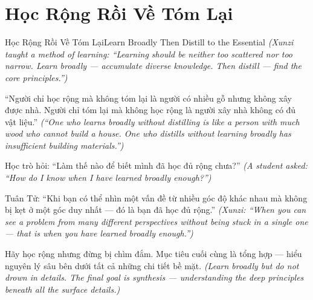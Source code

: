 \section{Học Rộng Rồi Về Tóm Lại}
\begin{truyen}{Học Rộng Rồi Về Tóm Lại}{Learn Broadly Then Distill to the Essential}
\textit{(Xunzi taught a method of learning: ``Learning should be neither too scattered nor too narrow. Learn broadly — accumulate diverse knowledge. Then distill — find the core principles.'')}

``Người chỉ học rộng mà không tóm lại là người có nhiều gỗ nhưng không xây được nhà. Người chỉ tóm lại mà không học rộng là người xây nhà không có đủ vật liệu.''
\textit{(``One who learns broadly without distilling is like a person with much wood who cannot build a house. One who distills without learning broadly has insufficient building materials.'')}

Học trò hỏi: ``Làm thế nào để biết mình đã học đủ rộng chưa?''
\textit{(A student asked: ``How do I know when I have learned broadly enough?'')}

Tuân Tử: ``Khi bạn có thể nhìn một vấn đề từ nhiều góc độ khác nhau mà không bị kẹt ở một góc duy nhất — đó là bạn đã học đủ rộng.''
\textit{(Xunzi: ``When you can see a problem from many different perspectives without being stuck in a single one — that is when you have learned broadly enough.'')}

\end{truyen}

\begin{baihoc}
Hãy học rộng nhưng đừng bị chìm đắm. Mục tiêu cuối cùng là tổng hợp — hiểu nguyên lý sâu bên dưới tất cả những chi tiết bề mặt.
\textit{(Learn broadly but do not drown in details. The final goal is synthesis — understanding the deep principles beneath all the surface details.)}
\end{baihoc}
\ngancach

